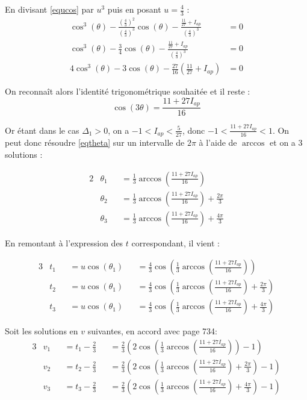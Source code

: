 \documentclass[12pt,a4paper,onecolumn]{article}
\begin{document}
En divisant \ref{equcos} par $u^3$ puis en posant $u = \frac{4}{3}$ :
\begin{align*}
\cos^3(\theta) - \frac{\left(\frac{4}{3}\right)^2}{\left(\frac{4}{3}\right)^3}\cos(\theta)-\frac{\frac{11}{27} + I_{ap}}{\left(\frac{4}{3}\right)^3} &= 0 \\
\cos^3(\theta) - \frac{3}{4}\cos(\theta) - \frac{\frac{11}{27} + I_{ap}}{\left(\frac{4}{3}\right)^3}&= 0 \\
4\cos^3(\theta) - 3\cos(\theta) - \frac{27}{16}\left(\frac{11}{27} + I_{ap}\right)&= 0 \tag*{en multipliant par 4}
\end{align*}

On reconnaît alors l'identité trigonométrique souhaitée et il reste :
\begin{equation}
\cos(3\theta) = \frac{11 + 27I_{ap}}{16} \label{eqtheta}
\end{equation}

Or étant dans le cas $\Delta_1 > 0$, on a $-1 < I_{ap} < \frac{5}{27}$, donc $-1 < \frac{11 + 27I_{ap}}{16} < 1$.
On peut donc résoudre \ref{eqtheta} sur un intervalle de $2\pi$ à l'aide de $\arccos$ et on a 3 solutions :

\begin{alignat*}{2}
&\theta_1 &&= \frac{1}{3}\arccos(\frac{11 + 27I_{ap}}{16})\\
&\theta_2 &&= \frac{1}{3}\arccos(\frac{11 + 27I_{ap}}{16}) + \frac{2\pi}{3}\\
&\theta_3 &&= \frac{1}{3}\arccos(\frac{11 + 27I_{ap}}{16}) + \frac{4\pi}{3}
\end{alignat*}

En remontant à l'expression des $t$ correspondant, il vient :

\begin{alignat*}{3}
&t_1 &&= u\cos(\theta_1) &&= \frac{4}{3}\cos(\frac{1}{3}\arccos(\frac{11 + 27I_{ap}}{16}))\\
&t_2 &&= u\cos(\theta_1) &&= \frac{4}{3}\cos(\frac{1}{3}\arccos(\frac{11 + 27I_{ap}}{16}) + \frac{2\pi}{3})\\
&t_3 &&= u\cos(\theta_1) &&= \frac{4}{3}\cos(\frac{1}{3}\arccos(\frac{11 + 27I_{ap}}{16}) + \frac{4\pi}{3})
\end{alignat*}

Soit les solutions en $v$ suivantes, en accord avec \cite{zwillinger2011crc} page 734:
\begin{alignat}{3}
&v_1 &&= t_1 - \frac{2}{3} &&= \displaystyle{\frac{2}{3}\left(2\cos\left(\frac{1}{3}\arccos\left(\frac{11 + 27I_{ap}}{16}\right)\right) - 1\right)} \label{Branche1}\\
&v_2 &&= t_2 - \frac{2}{3} &&= \displaystyle{\frac{2}{3}\left(2\cos\left(\frac{1}{3}\arccos\left(\frac{11 + 27I_{ap}}{16}\right) + \frac{2\pi}{3}\right) - 1\right)} \label{Branche2}\\
&v_3 &&= t_3 - \frac{2}{3} &&= \displaystyle{\frac{2}{3}\left(2\cos\left(\frac{1}{3}\arccos\left(\frac{11 + 27I_{ap}}{16}\right) + \frac{4\pi}{3}\right) - 1\right)} \label{Branche3}
\end{alignat}
\end{document}
